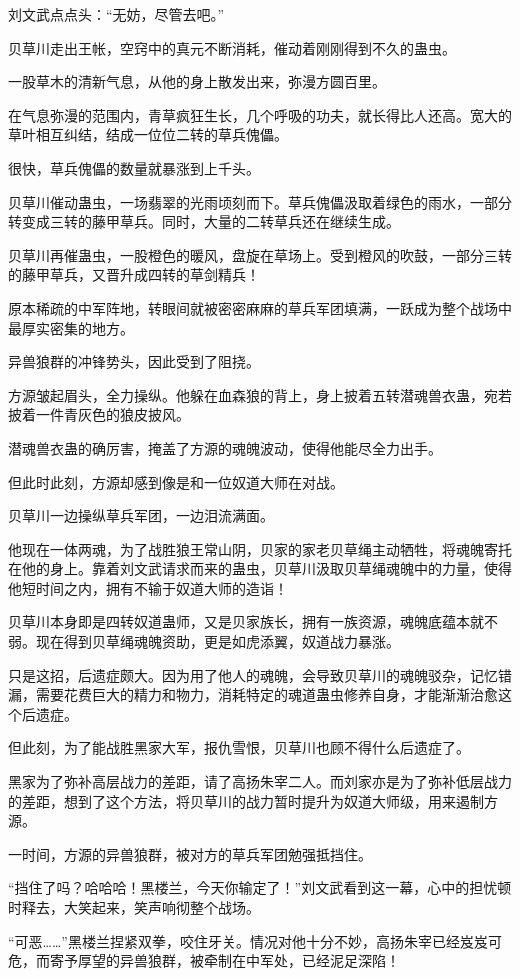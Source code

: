 \begin{this_body}
刘文武点点头：“无妨，尽管去吧。”

贝草川走出王帐，空窍中的真元不断消耗，催动着刚刚得到不久的蛊虫。

一股草木的清新气息，从他的身上散发出来，弥漫方圆百里。

在气息弥漫的范围内，青草疯狂生长，几个呼吸的功夫，就长得比人还高。宽大的草叶相互纠结，结成一位位二转的草兵傀儡。

很快，草兵傀儡的数量就暴涨到上千头。

贝草川催动蛊虫，一场翡翠的光雨顷刻而下。草兵傀儡汲取着绿色的雨水，一部分转变成三转的藤甲草兵。同时，大量的二转草兵还在继续生成。

贝草川再催蛊虫，一股橙色的暖风，盘旋在草场上。受到橙风的吹鼓，一部分三转的藤甲草兵，又晋升成四转的草剑精兵！

原本稀疏的中军阵地，转眼间就被密密麻麻的草兵军团填满，一跃成为整个战场中最厚实密集的地方。

异兽狼群的冲锋势头，因此受到了阻挠。

方源皱起眉头，全力操纵。他躲在血森狼的背上，身上披着五转潜魂兽衣蛊，宛若披着一件青灰色的狼皮披风。

潜魂兽衣蛊的确厉害，掩盖了方源的魂魄波动，使得他能尽全力出手。

但此时此刻，方源却感到像是和一位奴道大师在对战。

贝草川一边操纵草兵军团，一边泪流满面。

他现在一体两魂，为了战胜狼王常山阴，贝家的家老贝草绳主动牺牲，将魂魄寄托在他的身上。靠着刘文武请求而来的蛊虫，贝草川汲取贝草绳魂魄中的力量，使得他短时间之内，拥有不输于奴道大师的造诣！

贝草川本身即是四转奴道蛊师，又是贝家族长，拥有一族资源，魂魄底蕴本就不弱。现在得到贝草绳魂魄资助，更是如虎添翼，奴道战力暴涨。

只是这招，后遗症颇大。因为用了他人的魂魄，会导致贝草川的魂魄驳杂，记忆错漏，需要花费巨大的精力和物力，消耗特定的魂道蛊虫修养自身，才能渐渐治愈这个后遗症。

但此刻，为了能战胜黑家大军，报仇雪恨，贝草川也顾不得什么后遗症了。

黑家为了弥补高层战力的差距，请了高扬朱宰二人。而刘家亦是为了弥补低层战力的差距，想到了这个方法，将贝草川的战力暂时提升为奴道大师级，用来遏制方源。

一时间，方源的异兽狼群，被对方的草兵军团勉强抵挡住。

“挡住了吗？哈哈哈！黑楼兰，今天你输定了！”刘文武看到这一幕，心中的担忧顿时释去，大笑起来，笑声响彻整个战场。

“可恶……”黑楼兰捏紧双拳，咬住牙关。情况对他十分不妙，高扬朱宰已经岌岌可危，而寄予厚望的异兽狼群，被牵制在中军处，已经泥足深陷！


\end{this_body}
